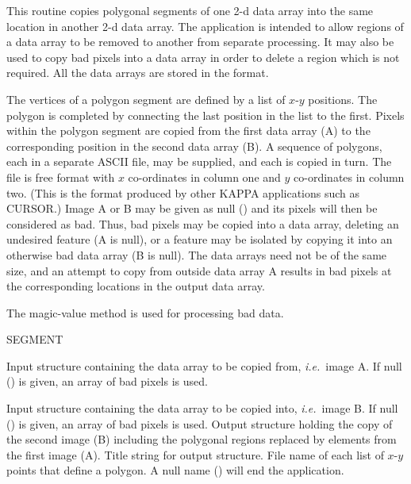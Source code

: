 {
\begin{manroutinedescription}
  This routine copies polygonal segments of one 2-d data array into
  the same location in another 2-d data array. The application is
  intended to allow regions of a data array to be removed to
  another from separate processing.  It may also be used to copy
  bad pixels into a data array in order to delete a region which is not
  required. All the data arrays are stored in the {} format.

  The vertices of a polygon segment are defined by a list of {$x$}-{$y$}
  positions. The polygon is completed by connecting the last position
  in the list to the first.  Pixels within the polygon segment are copied
  from the first data array (A) to the corresponding position in the
  second data array (B). A sequence of polygons, each in a separate ASCII
  file, may be supplied, and each is copied in turn.  The file is free
  format with {$x$} co-ordinates in column one and {$y$} co-ordinates in
  column two. (This is the format produced by other {\small KAPPA}
  applications such as CURSOR.) Image A or B may be given as null
  ({\mantt{!}}) and its pixels will then be considered as bad.  Thus,
  bad pixels may be copied into a data array, deleting an undesired
  feature (A is null), or a feature may be isolated by copying it into an
  otherwise bad data array (B is null).  The data arrays need not be of
  the same size, and an attempt to copy from outside data array A results
  in bad pixels at the corresponding locations in the output data array.

  The magic-value method is used for processing bad data.

  SEGMENT

\begin{manparametertable}
  Input {} structure containing the data array to be copied
  from, {\it i.e.}\ image A. If null ({\mantt{!}}) is given, an array of
  bad pixels is used.
\end{manparametertable}
\begin{manparametertable}
  Input {} structure containing the data array to be copied
  into, {\it i.e.}\ image B. If null ({\mantt{!}}) is given, an array of
  bad pixels is used.
  Output {} structure holding the copy of the second image
  (B) including the polygonal regions replaced by elements from the first
  image (A).
  Title string for output {} structure.
  \mbox{{}}
  File name of each list of {$x$}-{$y$} points that define a polygon.
  A null name ({\mantt{!}}) will end the application.
\end{manparametertable}


\end{manroutinedescription}}
